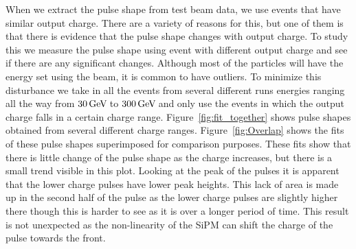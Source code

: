 When we extract the pulse shape from test beam data, we use events that have similar output charge. There are a variety of reasons for this, but one of them is that there is evidence that the pulse shape changes with output charge. To study this we measure the pulse shape using event with different output charge and see if there are any significant changes. Although most of the particles will have the energy set using the beam, it is common to have outliers. To minimize this disturbance we take in all the events from several different runs energies ranging all the way from $30 {\,\text{Ge\hspace{-.08em}V\hspace{-0.16em}}}$ to $300 {\,\text{Ge\hspace{-.08em}V\hspace{-0.16em}}}$ and only use the events in which the output charge falls in a certain charge range. Figure~\ref{fig:fit_together} shows pulse shapes obtained from several different charge ranges. Figure~\ref{fig:Overlap} shows the fits of these pulse shapes superimposed for comparison purposes. These fits show that there is little change of the pulse shape as the charge increases, but there is a small trend visible in this plot. Looking at the peak of the pulses it is apparent that the lower charge pulses have lower peak heights. This lack of area is made up in the second half of the pulse as the lower charge pulses are slightly higher there though this is harder to see as it is over a longer period of time. This result is not unexpected as the non-linearity of the SiPM can shift the charge of the pulse towards the front. 


